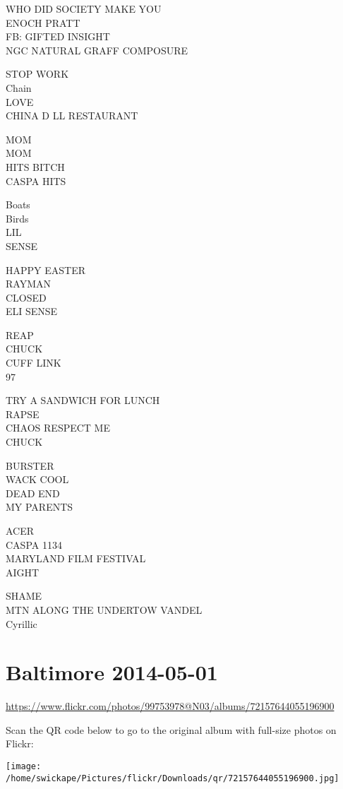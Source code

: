 \documentclass[10pt,letterpaper]{article}
\begin{document}
WHO DID SOCIETY MAKE YOU\\
ENOCH PRATT\\
FB: GIFTED INSIGHT\\
NGC NATURAL GRAFF COMPOSURE

STOP WORK\\
Chain\\
LOVE\\
CHINA D LL RESTAURANT

MOM\\
MOM\\
HITS BITCH\\
CASPA HITS

Boats\\
Birds\\
LIL\\
SENSE

HAPPY EASTER\\
RAYMAN\\
CLOSED\\
ELI SENSE

REAP\\
CHUCK\\
CUFF LINK\\
97

TRY A SANDWICH FOR LUNCH\\
RAPSE\\
CHAOS RESPECT ME\\
CHUCK

BURSTER\\
WACK COOL\\
DEAD END\\
MY PARENTS

ACER\\
CASPA 1134\\
MARYLAND FILM FESTIVAL\\
AIGHT

SHAME\\
MTN ALONG THE UNDERTOW VANDEL\\
Cyrillic


\section*{Baltimore 2014-05-01}

\url{https://www.flickr.com/photos/99753978@N03/albums/72157644055196900}

Scan the QR code below to go to the original album with full-size photos on Flickr:

\texttt{[image: /home/swickape/Pictures/flickr/Downloads/qr/72157644055196900.jpg]}
\end{document}

